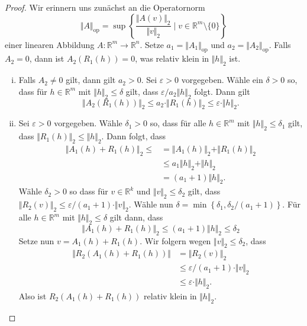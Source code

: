 \documentclass[../main.tex]{subfiles}
\begin{document}
\begin{proof}
  Wir erinnern uns zunächst an die Operatornorm
  \[
    \Vert A \Vert_{\text{op}} =
    \sup \left\{\frac{\Vert A(v) \Vert_2}{\Vert v \Vert_2}
    \mid v \in \mathbb{R}^m \setminus \{0\} \right\}
  \]
  einer linearen Abbildung $A \colon \mathbb{R}^m \to \mathbb{R}^n$.
  Setze $a_1 = \Vert A_1 \Vert_{\text{op}}$ und 
  $a_2 = \Vert A_2 \Vert_{\text{op}}$.
  Falls $A_2 = 0$, dann ist $A_2(R_1(h)) = 0$, was
  relativ klein in $\Vert h \Vert_2$ ist.
  \begin{enumerate}[(i)]
    \item 
      Falls $A_2 \neq 0$ gilt, dann gilt $a_2 > 0$.
      Sei $\varepsilon > 0$ vorgegeben. Wähle ein
      $\delta > 0$ so, dass
      für $h \in \mathbb{R}^m$ mit $\Vert h \Vert_2 \leq \delta$ gilt,
      dass $\varepsilon / a_2 \Vert h \Vert_2$ folgt.
      Dann gilt
      \[
        \Vert A_2(R_1(h)) \Vert_2 \leq a_2 \cdot \Vert R_1(h) \Vert_2
        \leq \varepsilon \cdot \Vert h \Vert_2.
      \]
    \item 
      Sei $\varepsilon > 0$ vorgegeben.
      Wähle $\delta_1 > 0$ so, dass für alle
      $h \in \mathbb{R}^m$ mit $\Vert h \Vert_2 \leq \delta_1$ 
      gilt, dass $\Vert R_1(h) \Vert_2 \leq \Vert h \Vert_2$.
      Dann folgt, dass
      \begin{align*}
        \Vert A_1(h) + R_1(h) \Vert_2 \leq 
        &= \Vert A_1(h) \Vert_2 + \Vert R_1(h) \Vert_2  \\
        &\leq a_1 \Vert h \Vert_2 + \Vert h \Vert_2 \\
        &= (a_1 + 1) \Vert h \Vert_2.
      \end{align*}
      Wähle $\delta_2 > 0$ so dass für
      $v \in \mathbb{R}^k$ 
      und $\Vert v \Vert_2 \leq \delta_2$ gilt,
      dass
      $\Vert R_2(v) \Vert_2 \leq \varepsilon/(a_1 + 1) \cdot \Vert v \Vert_2$.
      Wähle nun $\delta = \min \left\{\delta_1,
      \delta_2 / (a_1 + 1) \right\}$.
      Für alle $h \in \mathbb{R}^m$ mit
      $\Vert h \Vert_2 \leq \delta$ gilt dann, dass
      \[
        \Vert A_1(h) + R_1(h) \Vert_2
         \leq (a_1 + 1) \Vert h \Vert_2 \leq \delta_2
      \]
      Setze nun $v = A_1(h) + R_1(h)$.
      Wir folgern wegen $\Vert v \Vert_2 \leq \delta_2$, dass
      \begin{align*}
        \Vert R_2(A_1(h) + R_1(h)) \Vert 
        & = \Vert R_2(v) \Vert_2  \\
        &\leq \varepsilon / (a_1 + 1) \cdot \Vert v \Vert_2 \\
        &\leq \varepsilon \cdot \Vert h \Vert_2.
      \end{align*}
      Also ist $R_2(A_1(h) + R_1(h))$ relativ klein
      in $\Vert h \Vert_2$. \qedhere
  \end{enumerate}
\end{proof}
\end{document}
